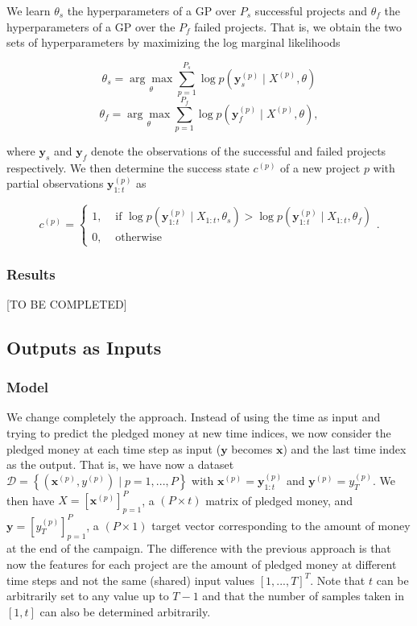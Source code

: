 \documentclass[11pt, oneside]{article}   	%
\begin{document}
			We learn $\theta_s$ the hyperparameters of a GP over $P_s$ successful projects  and $\theta_f$ the hyperparameters of a GP over the $P_f$ failed projects. That is, we obtain the two sets of hyperparameters by maximizing the log marginal likelihoods
        
                        \[\theta_s = \underset{\theta} {\arg\max} \sum_{p=1}^{P_s} \log p(\mathbf{y}_s^{(p)} \mid X^{(p)}, \theta)\]
                        \[\theta_f = \underset{\theta} {\arg\max} \sum_{p=1}^{P_f} \log p(\mathbf{y}_f^{(p)} \mid X^{(p)}, \theta),\]
                        
                        where $\mathbf{y}_s$ and $\mathbf{y}_f$ denote the observations of the successful and failed projects respectively. We then determine the success state $c^{(p)}$ of a new project $p$ with partial observations $\mathbf{y}_{1:t}^{(p)}$ as
                        
                        \[c^{(p)} = 
                        \begin{cases}
                            1, & \text{ if } \log p(\mathbf{y}_{1:t}^{(p)} \mid X_{1:t}, \theta_s) > \log p(\mathbf{y}_{1:t}^{(p)} \mid X_{1:t}, \theta_f) \\
                            0, & \text{ otherwise }
                        \end{cases}.\]
            
         	\subsubsection*{Results}
		[TO BE COMPLETED]
        
         \subsection{Outputs as Inputs}
         	\subsubsection*{Model}
        			We change completely the approach. Instead of using the time as input and trying to predict the pledged money at new time indices, we now consider the pledged money at each time step as input ($\mathbf{y}$ becomes $\mathbf{x}$) and the last time index as the output. That is, we have now a dataset $\mathcal{D} = \left\{ (\mathbf{x}^{(p)}, y^{(p)}) \mid p = 1, ..., P \right\}$ with $\mathbf{x}^{(p)} = \mathbf{y}_{1:t}^{(p)}$ and $\mathbf{y}^{(p)} = y_T^{(p)}$. We then have $X = \left[\mathbf{x}^{(p)}\right]_{p=1}^P$, a $(P \times t)$ matrix of pledged money, and $\mathbf{y} = \left[y_T^{(p)}\right]_{p=1}^P$, a $(P \times 1)$ target vector corresponding to the amount of money at the end of the campaign. The difference with the previous approach is that now the features for each project are the amount of pledged money at different time steps and not the same (shared) input values $[1,...,T]^T$. Note that $t$ can be arbitrarily set to any value up to $T-1$ and that the number of samples taken in $[1, t]$ can also be determined arbitrarily.
        
\end{document}
